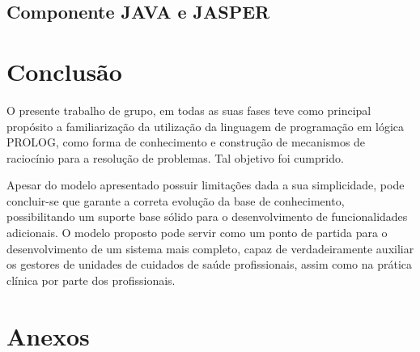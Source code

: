 \documentclass[
  oneside,
  10pt, a4paper,
  footinclude=true,
  headinclude=true,
  cleardoublepage=empty
]{scrbook}
\begin{document}
% 
%
%
%
%
%

\section{Componente JAVA e JASPER}





	\chapter{Conclusão}
	
	
	
	O presente trabalho de grupo, em todas as suas fases teve como principal propósito a familiarização da utilização da linguagem de programação em lógica PROLOG, como forma de conhecimento e construção de
mecanismos de raciocínio para a resolução de problemas. Tal objetivo foi cumprido.\par 
		Apesar do modelo apresentado possuir limitações dada a sua simplicidade, pode concluir-se que garante a correta evolução da base de conhecimento, possibilitando um suporte base sólido para o desenvolvimento de funcionalidades adicionais. 
		O modelo proposto pode servir como um ponto de partida para o 
desenvolvimento de um sistema mais completo, capaz de verdadeiramente auxiliar os gestores de unidades de cuidados de saúde profissionais, assim como na prática clínica por parte dos profissionais.
			
			
%	


	
	
		\chapter{Anexos}
\end{document}

